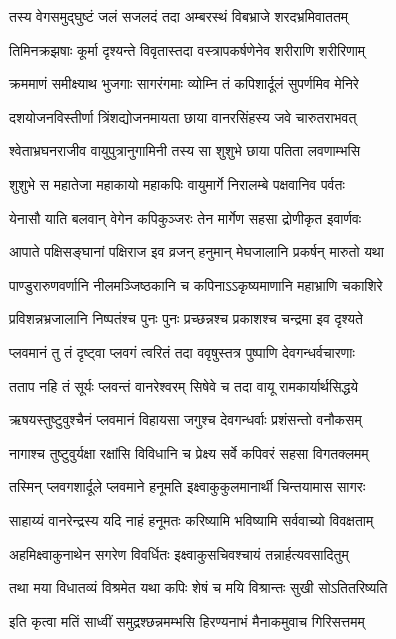 \twolineshloka
{तस्य वेगसमुद्घुष्टं जलं सजलदं तदा}
{अम्बरस्थं विबभ्राजे शरदभ्रमिवाततम्} %

\twolineshloka
{तिमिनक्रझषाः कूर्मा दृश्यन्ते विवृतास्तदा}
{वस्त्रापकर्षणेनेव शरीराणि शरीरिणाम्} %

\twolineshloka
{क्रममाणं समीक्ष्याथ भुजगाः सागरंगमाः}
{व्योम्नि तं कपिशार्दूलं सुपर्णमिव मेनिरे} %

\twolineshloka
{दशयोजनविस्तीर्णा त्रिंशद्योजनमायता}
{छाया वानरसिंहस्य जवे चारुतराभवत्} %

\twolineshloka
{श्वेताभ्रघनराजीव वायुपुत्रानुगामिनी}
{तस्य सा शुशुभे छाया पतिता लवणाम्भसि} %

\twolineshloka
{शुशुभे स महातेजा महाकायो महाकपिः}
{वायुमार्गे निरालम्बे पक्षवानिव पर्वतः} %

\twolineshloka
{येनासौ याति बलवान् वेगेन कपिकुञ्जरः}
{तेन मार्गेण सहसा द्रोणीकृत इवार्णवः} %

\twolineshloka
{आपाते पक्षिसङ्घानां पक्षिराज इव व्रजन्}
{हनुमान् मेघजालानि प्रकर्षन् मारुतो यथा} %

\twolineshloka
{पाण्डुरारुणवर्णानि नीलमञ्जिष्ठकानि च}
{कपिनाऽऽकृष्यमाणानि महाभ्राणि चकाशिरे} %

\twolineshloka
{प्रविशन्नभ्रजालानि निष्पतंश्च पुनः पुनः}
{प्रच्छन्नश्च प्रकाशश्च चन्द्रमा इव दृश्यते} %

\twolineshloka
{प्लवमानं तु तं दृष्ट्वा प्लवगं त्वरितं तदा}
{ववृषुस्तत्र पुष्पाणि देवगन्धर्वचारणाः} %

\twolineshloka
{तताप नहि तं सूर्यः प्लवन्तं वानरेश्वरम्}
{सिषेवे च तदा वायू रामकार्यार्थसिद्धये} %

\twolineshloka
{ऋषयस्तुष्टुवुश्चैनं प्लवमानं विहायसा}
{जगुश्च देवगन्धर्वाः प्रशंसन्तो वनौकसम्} %

\twolineshloka
{नागाश्च तुष्टुवुर्यक्षा रक्षांसि विविधानि च}
{प्रेक्ष्य सर्वे कपिवरं सहसा विगतक्लमम्} %

\twolineshloka
{तस्मिन् प्लवगशार्दूले प्लवमाने हनूमति}
{इक्ष्वाकुकुलमानार्थी चिन्तयामास सागरः} %

\twolineshloka
{साहाय्यं वानरेन्द्रस्य यदि नाहं हनूमतः}
{करिष्यामि भविष्यामि सर्ववाच्यो विवक्षताम्} %

\twolineshloka
{अहमिक्ष्वाकुनाथेन सगरेण विवर्धितः}
{इक्ष्वाकुसचिवश्चायं तन्नार्हत्यवसादितुम्} %

\twolineshloka
{तथा मया विधातव्यं विश्रमेत यथा कपिः}
{शेषं च मयि विश्रान्तः सुखी सोऽतितरिष्यति} %

\twolineshloka
{इति कृत्वा मतिं साध्वीं समुद्रश्छन्नमम्भसि}
{हिरण्यनाभं मैनाकमुवाच गिरिसत्तमम्} %

